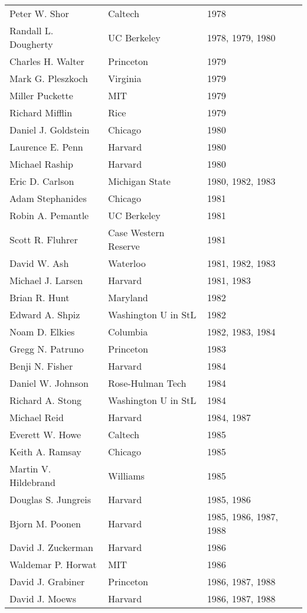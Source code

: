 \documentclass[12pt]{article}
\begin{document}
\begin{tabular}{|l|l|l|}
Peter W. Shor & Caltech & 1978 \\
Randall L. Dougherty & UC Berkeley & 1978, 1979, 1980 \\
Charles H. Walter & Princeton & 1979 \\
Mark G. Pleszkoch & Virginia & 1979 \\
Miller Puckette & MIT & 1979 \\
Richard Mifflin & Rice & 1979 \\
Daniel J. Goldstein & Chicago & 1980 \\
Laurence E. Penn & Harvard & 1980 \\
Michael Raship & Harvard & 1980 \\
Eric D. Carlson & Michigan State & 1980, 1982, 1983 \\
Adam Stephanides & Chicago & 1981 \\
Robin A. Pemantle & UC Berkeley & 1981 \\
Scott R. Fluhrer & Case Western Reserve & 1981 \\
David W. Ash & Waterloo & 1981, 1982, 1983 \\
Michael J. Larsen & Harvard & 1981, 1983 \\
Brian R. Hunt & Maryland & 1982 \\
Edward A. Shpiz & Washington U in StL & 1982 \\
Noam D. Elkies & Columbia & 1982, 1983, 1984 \\
Gregg N. Patruno & Princeton & 1983 \\
Benji N. Fisher & Harvard & 1984 \\
Daniel W. Johnson & Rose-Hulman Tech & 1984 \\
Richard A. Stong & Washington U in StL & 1984 \\
Michael Reid & Harvard & 1984, 1987 \\
Everett W. Howe & Caltech & 1985 \\
Keith A. Ramsay & Chicago & 1985 \\
Martin V. Hildebrand & Williams & 1985 \\
Douglas S. Jungreis & Harvard & 1985, 1986 \\
Bjorn M. Poonen & Harvard & 1985, 1986, 1987, 1988 \\
David J. Zuckerman & Harvard & 1986 \\
Waldemar P. Horwat & MIT & 1986 \\
David J. Grabiner & Princeton & 1986, 1987, 1988 \\
David J. Moews & Harvard & 1986, 1987, 1988 \\

\end{tabular}
\end{document}
